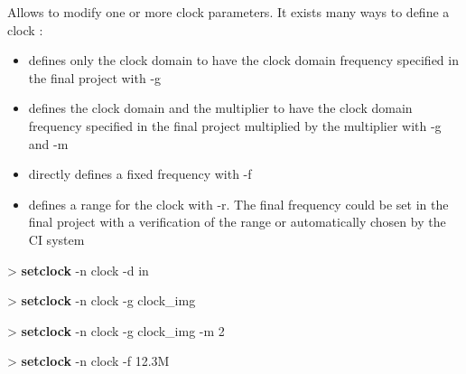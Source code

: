 \documentclass[10pt,a4paper]{article}
\begin{document}
Allows to modify one or more clock parameters. It exists many ways to define a clock :
\begin{itemize}
\item defines only the clock domain to have the clock domain frequency specified in the final project with -g
\item defines the clock domain and the multiplier to have the clock domain frequency specified in the final project multiplied by the multiplier with -g and -m
\item directly defines a fixed frequency with -f
\item defines a range for the clock with -r. The final frequency could be set in the final project with a verification of the range or automatically chosen by the CI system
\end{itemize}


\begin{sampletitle}[1]
> \textbf{\tool{} setclock} -n clock -d in
\end{sampletitle}

\begin{sampletitle}[2]
> \textbf{\tool{} setclock} -n clock -g clock\_img
\end{sampletitle}

\begin{sampletitle}[3]
> \textbf{\tool{} setclock} -n clock -g clock\_img -m 2
\end{sampletitle}

\begin{sampletitle}[4]
> \textbf{\tool{} setclock} -n clock -f 12.3M
\end{sampletitle}
\end{document}
